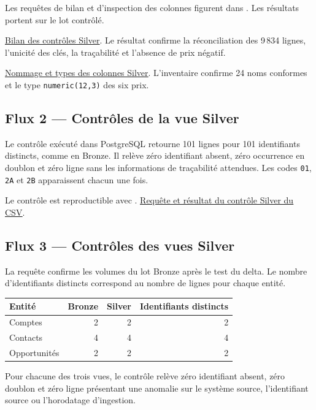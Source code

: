 \documentclass[11pt,a4paper]{article}
\newcommand{\code}[1]{\texttt{#1}}
\newcommand{\preuve}[2]{%
  \href{https://github.com/MAHDIghr/projet_big_data_starter/blob/27cc8348f6737a75bb24a40d6d8cda3ae54996b3/preuves/#1}{\textcolor{encre}{\underline{#2}}}}
\begin{document}
Les requêtes de bilan et d'inspection des colonnes figurent
dans . Les résultats portent sur
le lot contrôlé.

\preuve{api/api_11_carburants_controle_silver.png}{Bilan des contrôles Silver}. Le résultat confirme la
réconciliation des 9\,834 lignes, l'unicité des clés, la traçabilité
et l'absence de prix négatif.

\preuve{api/api_12_carburants_structure_silver.png}{Nommage et types des colonnes Silver}. L'inventaire confirme
24 noms conformes et le type \code{numeric(12,3)} des six prix.

\subsection{Flux 2 --- Contrôles de la vue Silver}

Le contrôle exécuté dans PostgreSQL retourne 101 lignes pour
101 identifiants distincts, comme en Bronze. Il relève zéro
identifiant absent, zéro occurrence en doublon et zéro ligne
sans les informations de traçabilité attendues. Les codes
\code{01}, \code{2A} et \code{2B} apparaissent chacun une fois.

Le contrôle est reproductible avec .
\preuve{csv/csv_05_departements_controle_silver.png}{Requête et résultat du contrôle Silver du CSV}.

\subsection{Flux 3 --- Contrôles des vues Silver}

La requête  confirme les volumes du lot
Bronze après le test du delta. Le nombre d'identifiants distincts
correspond au nombre de lignes pour chaque entité.

\begin{tabularx}{\linewidth}{@{}Xrrr@{}}
\toprule
Entité & Bronze & Silver & Identifiants distincts \\
\midrule
Comptes & 2 & 2 & 2 \\
Contacts & 4 & 4 & 4 \\
Opportunités & 2 & 2 & 2 \\
\bottomrule
\end{tabularx}

Pour chacune des trois vues, le contrôle relève zéro identifiant absent,
zéro doublon et zéro ligne présentant une anomalie sur le système source,
l'identifiant source ou l'horodatage d'ingestion.
\end{document}

